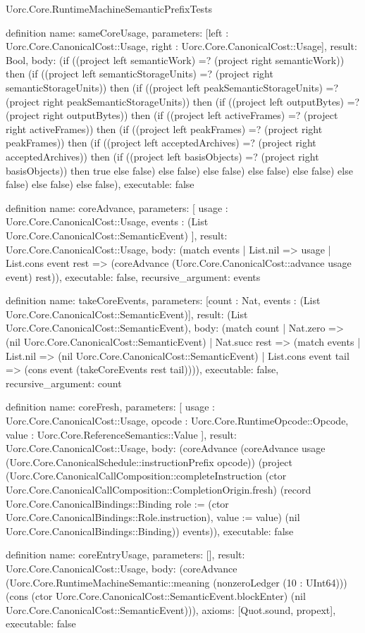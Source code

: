 \begin{lexlean}{Uorc.Core.RuntimeMachineSemanticPrefixTests}
\begin{semanticmodule}
definition{
  name: sameCoreUsage,
  parameters: [left : Uorc.Core.CanonicalCost::Usage, right : Uorc.Core.CanonicalCost::Usage],
  result: Bool,
  body: (if ((project left semanticWork) =? (project right semanticWork)) then (if ((project left semanticStorageUnits) =? (project right semanticStorageUnits)) then (if ((project left peakSemanticStorageUnits) =? (project right peakSemanticStorageUnits)) then (if ((project left outputBytes) =? (project right outputBytes)) then (if ((project left activeFrames) =? (project right activeFrames)) then (if ((project left peakFrames) =? (project right peakFrames)) then (if ((project left acceptedArchives) =? (project right acceptedArchives)) then (if ((project left basisObjects) =? (project right basisObjects)) then true else false) else false) else false) else false) else false) else false) else false) else false),
  executable: false
}

definition{
  name: coreAdvance,
  parameters: [
    usage : Uorc.Core.CanonicalCost::Usage,
    events : (List Uorc.Core.CanonicalCost::SemanticEvent)
  ],
  result: Uorc.Core.CanonicalCost::Usage,
  body: (match events
    | List.nil => usage
    | List.cons event rest => (coreAdvance (Uorc.Core.CanonicalCost::advance usage event) rest)),
  executable: false,
  recursive_argument: events
}

definition{
  name: takeCoreEvents,
  parameters: [count : Nat, events : (List Uorc.Core.CanonicalCost::SemanticEvent)],
  result: (List Uorc.Core.CanonicalCost::SemanticEvent),
  body: (match count
    | Nat.zero => (nil Uorc.Core.CanonicalCost::SemanticEvent)
    | Nat.succ rest => (match events
      | List.nil => (nil Uorc.Core.CanonicalCost::SemanticEvent)
      | List.cons event tail => (cons event (takeCoreEvents rest tail)))),
  executable: false,
  recursive_argument: count
}

definition{
  name: coreFresh,
  parameters: [
    usage : Uorc.Core.CanonicalCost::Usage,
    opcode : Uorc.Core.RuntimeOpcode::Opcode,
    value : Uorc.Core.ReferenceSemantics::Value
  ],
  result: Uorc.Core.CanonicalCost::Usage,
  body: (coreAdvance (coreAdvance usage (Uorc.Core.CanonicalSchedule::instructionPrefix opcode)) (project (Uorc.Core.CanonicalCallComposition::completeInstruction (ctor Uorc.Core.CanonicalCallComposition::CompletionOrigin.fresh) (record Uorc.Core.CanonicalBindings::Binding {role := (ctor Uorc.Core.CanonicalBindings::Role.instruction), value := value}) (nil Uorc.Core.CanonicalBindings::Binding)) events)),
  executable: false
}

definition{
  name: coreEntryUsage,
  parameters: [],
  result: Uorc.Core.CanonicalCost::Usage,
  body: (coreAdvance (Uorc.Core.RuntimeMachineSemantic::meaning (nonzeroLedger (10 : UInt64))) (cons (ctor Uorc.Core.CanonicalCost::SemanticEvent.blockEnter) (nil Uorc.Core.CanonicalCost::SemanticEvent))),
  axioms: [Quot.sound, propext],
  executable: false
}


\end{semanticmodule}
\end{lexlean}
